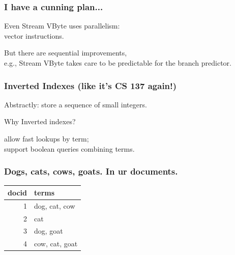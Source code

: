\begin{frame}
\frametitle{I have a cunning plan...}



Even Stream VByte uses parallelism:\\
\hspace*{2em}vector instructions. 

But there
are sequential improvements, \\
e.g., Stream VByte takes care to be predictable
for the branch predictor.


\end{frame}
\begin{frame}
\frametitle{Inverted Indexes (like it's CS 137 again!)}



\vspace*{-1em}
Abstractly: store a sequence of small integers.


Why Inverted indexes?

\hspace*{1cm}allow fast lookups by term;\\
\hspace*{1cm}support boolean queries combining terms.



\end{frame}
\begin{frame}
\frametitle{Dogs, cats, cows, goats. In ur documents.}


\begin{center}
\begin{tabular}{r|l}
docid & terms \\ \hline
1 & dog, cat, cow\\
2 & cat\\
3 & dog, goat\\
4 & cow, cat, goat\\
\end{tabular}
\end{center}


\end{frame}


